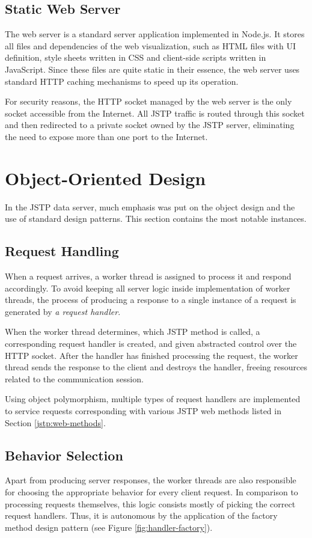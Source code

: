 \subsection{Static Web Server}
The web server is a standard server application implemented in Node.js. It stores all files and dependencies of the web visualization, such as HTML files with UI definition, style sheets written in CSS and client-side scripts written in JavaScript. Since these files are quite static in their essence, the web server uses standard HTTP caching mechanisms to speed up its operation.

For security reasons, the HTTP socket managed by the web server is the only socket accessible from the Internet. All JSTP traffic is routed through this socket and then redirected to a private socket owned by the JSTP server, eliminating the need to expose more than one port to the Internet.

\section{Object-Oriented Design}
In the JSTP data server, much emphasis was put on the object design and the use of standard design patterns. \cite{DesignPatterns} This section contains the most notable instances.

\subsection{Request Handling}
When a request arrives, a worker thread is assigned to process it and respond accordingly. To avoid keeping all server logic inside implementation of worker threads, the process of producing a response to a single instance of a request is generated by \textit{a request handler}.

When the worker thread determines, which JSTP method is called, a corresponding request handler is created, and given abstracted control over the HTTP socket. After the handler has finished processing the request, the worker thread sends the response to the client and destroys the handler, freeing resources related to the communication session.

Using object polymorphism, multiple types of request handlers are implemented to service requests corresponding with various JSTP web methods listed in Section \ref{jstp:web-methods}.

\subsection{Behavior Selection}
Apart from producing server responses, the worker threads are also responsible for choosing the appropriate behavior for every client request. In comparison to processing requests themselves, this logic consists mostly of picking the correct request handlers. Thus, it is autonomous by the application of the factory method design pattern (see Figure \ref{fig:handler-factory}). \cite{DesignPatterns}

